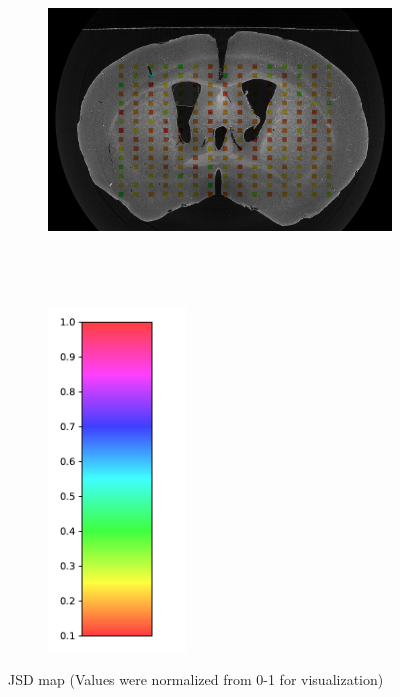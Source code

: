 \documentclass[11pt]{article}
\begin{document}
\begin{figure}[H]
  \centering
  \hspace{-5em}
  \begin{subfigure}[b]{0.9\textwidth}
    \centering
    \includegraphics[height=9cm]{figs/jsd}
  \end{subfigure}
  \hspace{-3em}
  \begin{subfigure}[b]{0.05\textwidth}
    \centering
    \includegraphics[height=9.1cm]{figs/cmap}
  \end{subfigure}
  \captionsetup{width=0.9\textwidth}
  \caption{JSD map (Values were normalized from 0-1 for visualization)}
  \label{fig:jsdmap}
\end{figure}
\end{document}
